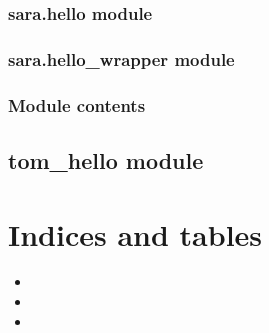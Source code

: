 \documentclass[letterpaper,10pt,english]{sphinxmanual}
\begin{document}
\subsection{sara.hello module}
\label{\detokenize{sara:module-sara.hello}}\label{\detokenize{sara:sara-hello-module}}

\begin{fulllineitems}
\label{\detokenize{sara:sara.hello.say_hello}}
\end{fulllineitems}



\subsection{sara.hello\_wrapper module}
\label{\detokenize{sara:sara-hello-wrapper-module}}

\subsection{Module contents}
\label{\detokenize{sara:module-sara}}\label{\detokenize{sara:module-contents}}

\section{tom\_hello module}
\label{\detokenize{tom_hello:module-tom_hello}}\label{\detokenize{tom_hello:tom-hello-module}}\label{\detokenize{tom_hello::doc}}

\chapter{Indices and tables}
\label{\detokenize{index:indices-and-tables}}\begin{itemize}
\item {} 

\item {} 

\item {} 

\end{itemize}
\end{document}

